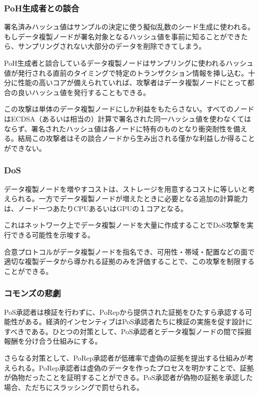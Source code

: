 \documentclass[12pt]{ltjsarticle}
\begin{document}
\subsubsection{PoH生成者との談合}

署名済みハッシュ値はサンプルの決定に使う擬似乱数のシード生成に使われる。もしデータ複製ノードが署名対象となるハッシュ値を事前に知ることができたら、サンプリングされない大部分のデータを削除できてしまう。

PoH生成者と談合しているデータ複製ノードはサンプリングに使われるハッシュ値が発行される直前のタイミングで特定のトランザクション情報を挿し込む。十分に性能の高いコアが備えられていれば、攻撃者はデータ複製ノードにとって都合の良いハッシュ値を発行することもできる。

この攻撃は単体のデータ複製ノードにしか利益をもたらさない。すべてのノードはECDSA（あるいは相当の）計算で署名された同一ハッシュ値を使わなくてはならず、署名されたハッシュ値は各ノードに特有のものとなり衝突耐性を備える。結局この攻撃者はその談合ノードから生み出される僅かな利益しか得ることができない。

\subsubsection{DoS}
データ複製ノードを増やすコストは、ストレージを用意するコストに等しいと考えられる。一方でデータ複製ノードが増えたときに必要となる追加の計算能力は、ノード一つあたりCPUあるいはGPUの１コアとなる。

これはネットワーク上でデータ複製ノードを大量に作成することでDoS攻撃を実行できる可能性を示唆する。

合意プロトコルがデータ複製ノードを指名でき、可用性・帯域・配置などの面で適切な複製データから導かれる証拠のみを評価することで、この攻撃を制限することができる。

\subsubsection{コモンズの悲劇}

PoS承認者は検証を行わずに、PoRepから提供された証拠をひたすら承認する可能性がある。経済的インセンティブはPoS承認者たちに検証の実施を促す設計にすべきである。ひとつの対策として、PoS承認者とデータ複製ノードの間で採掘報酬を分け合う仕組みにする。

さらなる対策として、PoRep承認者が低確率で虚偽の証拠を提出する仕組みが考えられる。PoRep承認者は虚偽のデータを作ったプロセスを明かすことで、証拠が偽物だったことを証明することができる。PoS承認者が偽物の証拠を承認した場合、ただちにスラッシングで罰せられる。
\end{document}
